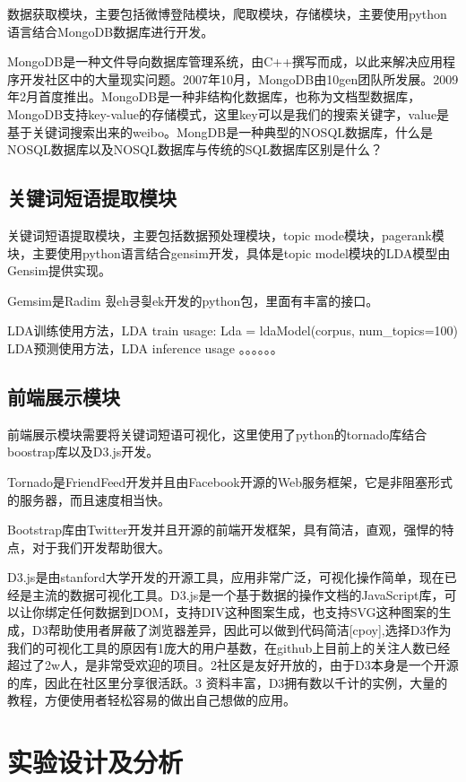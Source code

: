 \documentclass[master]{njuthesis}
\begin{document}
    数据获取模块，主要包括微博登陆模块，爬取模块，存储模块，主要使用python语言结合MongoDB数据库进行开发。
    
    MongoDB是一种文件导向数据库管理系统，由C++撰写而成，以此来解决应用程序开发社区中的大量现实问题。2007年10月，MongoDB由10gen团队所发展。2009年2月首度推出。MongoDB是一种非结构化数据库，也称为文档型数据库，MongoDB支持key-value的存储模式，这里key可以是我们的搜索关键字，value是基于关键词搜索出来的weibo。MongDB是一种典型的NOSQL数据库，什么是NOSQL数据库以及NOSQL数据库与传统的SQL数据库区别是什么？

\subsection{关键词短语提取模块}
    
    关键词短语提取模块，主要包括数据预处理模块，topic mode模块，pagerank模块，主要使用python语言结合gensim开发，具体是topic model模块的LDA模型由Gensim提供实现。
    
    Gemsim是Radim 힀eh킁힂ek开发的python包，里面有丰富的接口。

    LDA训练使用方法，LDA train usage: Lda = ldaModel(corpus, num\_topics=100)
    LDA预测使用方法，LDA inference usage 。。。。。。

\subsection{前端展示模块}
    
    前端展示模块需要将关键词短语可视化，这里使用了python的tornado库结合boostrap库以及D3.js开发。
    
    Tornado是FriendFeed开发并且由Facebook开源的Web服务框架，它是非阻塞形式的服务器，而且速度相当快。
    
    Bootstrap库由Twitter开发并且开源的前端开发框架，具有简洁，直观，强悍的特点，对于我们开发帮助很大。
    
    D3.js是由stanford大学开发的开源工具，应用非常广泛，可视化操作简单，现在已经是主流的数据可视化工具。D3.js是一个基于数据的操作文档的JavaScript库，可以让你绑定任何数据到DOM，支持DIV这种图案生成，也支持SVG这种图案的生成，D3帮助使用者屏蔽了浏览器差异，因此可以做到代码简洁[cpoy],选择D3作为我们的可视化工具的原因有1庞大的用户基数，在github上目前上的关注人数已经超过了2w人，是非常受欢迎的项目。2社区是友好开放的，由于D3本身是一个开源的库，因此在社区里分享很活跃。3 资料丰富，D3拥有数以千计的实例，大量的教程，方便使用者轻松容易的做出自己想做的应用。


\section{实验设计及分析}
\end{document}
